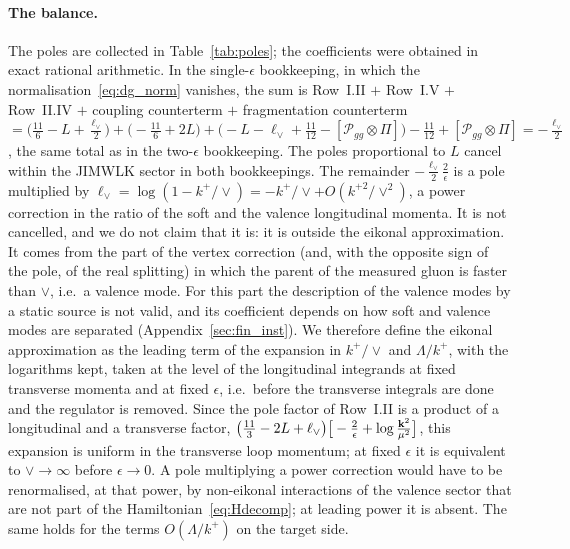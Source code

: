 \paragraph{The balance.} The poles are collected in Table~\ref{tab:poles}; the coefficients were obtained in exact rational arithmetic. In the single-$\epsilon$ bookkeeping, in which the normalisation~\eqref{eq:dg_norm} vanishes, the sum is Row~I.II $+$ Row~I.V $+$ Row~II.IV $+$ coupling counterterm $+$ fragmentation counterterm $=\big(\frac{11}{6}-L+\frac{\ell_\vee}{2}\big)+\big(-\frac{11}{6}+2L\big)+\big(-L-\ell_\vee+\frac{11}{12}-[\mathcal P_{gg}\otimes\Pi]\big)-\frac{11}{12}+[\mathcal P_{gg}\otimes\Pi]=-\frac{\ell_\vee}{2}$, the same total as in the two-$\epsilon$ bookkeeping. The poles proportional to $L$ cancel within the JIMWLK sector in both bookkeepings. The remainder $-\frac{\ell_\vee}{2}\frac2\epsilon$ is a pole multiplied by $\ell_\vee=\log(1-k^+/\vee)=-k^+/\vee+O(k^{+2}/\vee^2)$, a power correction in the ratio of the soft and the valence longitudinal momenta. It is not cancelled, and we do not claim that it is: it is outside the eikonal approximation. It comes from the part of the vertex correction (and, with the opposite sign of the pole, of the real splitting) in which the parent of the measured gluon is faster than $\vee$, i.e.\ a valence mode. For this part the description of the valence modes by a static source is not valid, and its coefficient depends on how soft and valence modes are separated (Appendix~\ref{sec:fin_inst}). We therefore define the eikonal approximation as the leading term of the expansion in $k^+/\vee$ and $\Lambda/k^+$, with the logarithms kept, taken at the level of the longitudinal integrands at fixed transverse momenta and at fixed $\epsilon$, i.e.\ before the transverse integrals are done and the regulator is removed. Since the pole factor of Row~I.II is a product of a longitudinal and a transverse factor, $\big(\frac{11}{3}-2L+\ell_\vee\big)\big[-\frac2\epsilon+\log\frac{\mathbf{k}^2}{\mu^2}\big]$, this expansion is uniform in the transverse loop momentum; at fixed $\epsilon$ it is equivalent to $\vee\to\infty$ before $\epsilon\to0$. A pole multiplying a power correction would have to be renormalised, at that power, by non-eikonal interactions of the valence sector that are not part of the Hamiltonian~\eqref{eq:Hdecomp}; at leading power it is absent. The same holds for the terms $O(\Lambda/k^+)$ on the target side.

